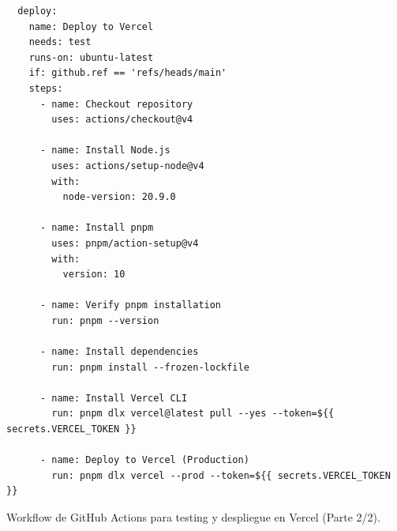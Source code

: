 \begin{ifalgorithm}[H]
  \begin{lstlisting}
  deploy:
    name: Deploy to Vercel
    needs: test
    runs-on: ubuntu-latest
    if: github.ref == 'refs/heads/main'
    steps:
      - name: Checkout repository
        uses: actions/checkout@v4

      - name: Install Node.js
        uses: actions/setup-node@v4
        with:
          node-version: 20.9.0

      - name: Install pnpm
        uses: pnpm/action-setup@v4
        with:
          version: 10

      - name: Verify pnpm installation
        run: pnpm --version

      - name: Install dependencies
        run: pnpm install --frozen-lockfile

      - name: Install Vercel CLI
        run: pnpm dlx vercel@latest pull --yes --token=${{ secrets.VERCEL_TOKEN }}

      - name: Deploy to Vercel (Production)
        run: pnpm dlx vercel --prod --token=${{ secrets.VERCEL_TOKEN }}
  \end{lstlisting}
  \caption{Workflow de GitHub Actions para testing y despliegue en Vercel (Parte 2/2).}
  \label{alg:github_actions_2}
\end{ifalgorithm}

